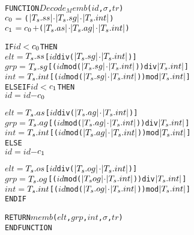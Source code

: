 \documentclass[11pt]{report}
\newenvironment{vverbatim}
{
  \begin{alltt}
}
{
  \vspace{-\baselineskip}
  \end{alltt}
}
\begin{document}
        \begin{vverbatim}
  FUNCTION \(Decode_Memb\)(\(id\), \(\sigma\), \(tr\))
    \(c\sb{0}\) \(=\) (\(|T\sb{s}.ss|\) \(\cdot\) \(|T\sb{s}.sg|\) \(\cdot\) \(|T\sb{s}.int|\)) 
    \(c\sb{1}\) \(=\) \(c\sb{0}\) \(+\) (\(|T\sb{s}.as|\) \(\cdot\) \(|T\sb{s}.ag|\) \(\cdot\) \(|T\sb{s}.int|\)) 

    IF \(id\) \(<\) \(c\sb{0}\) THEN
      \(elt\) \(=\) \(T\sb{s}.ss\)[\(id\) div (\(|T\sb{s}.sg|\) \(\cdot\) \(|T\sb{s}.int|\))]
      \(grp\) \(=\) \(T\sb{s}.sg\)[(\(id\) mod (\(|T\sb{s}.sg|\) \(\cdot\) \(|T\sb{s}.int|\))) div \(|T\sb{s}.int|\)]
      \(int\) \(=\) \(T\sb{s}.int\)[(\(id\) mod (\(|T\sb{s}.sg|\) \(\cdot\) \(|T\sb{s}.int|\))) mod \(|T\sb{s}.int|\)]
    ELSE IF \(id\) \(<\) \(c\sb{1}\) THEN
      \(id\) \(=\) \(id\) \(-\) \(c\sb{0}\)

      \(elt\) \(=\) \(T\sb{s}.as\)[\(id\) div (\(|T\sb{s}.ag|\) \(\cdot\) \(|T\sb{s}.int|\))]
      \(grp\) \(=\) \(T\sb{s}.ag\)[(\(id\) mod (\(|T\sb{s}.ag|\) \(\cdot\) \(|T\sb{s}.int|\))) div \(|T\sb{s}.int|\)]
      \(int\) \(=\) \(T\sb{s}.int\)[(\(id\) mod (\(|T\sb{s}.ag|\) \(\cdot\) \(|T\sb{s}.int|\))) mod \(|T\sb{s}.int|\)]
    ELSE
      \(id\) \(=\) \(id\) \(-\) \(c\sb{1}\)

      \(elt\) \(=\) \(T\sb{s}.os\)[\(id\) div (\(|T\sb{s}.og|\) \(\cdot\) \(|T\sb{s}.int|\))]
      \(grp\) \(=\) \(T\sb{s}.og\)[(\(id\) mod (\(|T\sb{s}og|\) \(\cdot\) \(|T\sb{s}.int|\))) div \(|T\sb{s}.int|\)]
      \(int\) \(=\) \(T\sb{s}.int\)[(\(id\) mod (\(|T\sb{s}.og|\) \(\cdot\) \(|T\sb{s}.int|\))) mod \(|T\sb{s}.int|\)]
    ENDIF

    RETURN \(memb\)(\(elt\), \(grp\), \(int\), \(\sigma\), \(tr\))
  ENDFUNCTION
        \end{vverbatim}
\end{document}
